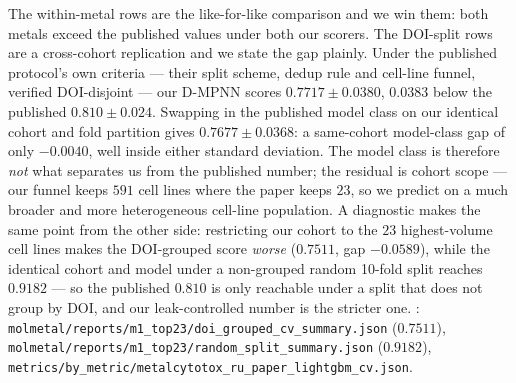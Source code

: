 The within-metal rows are the like-for-like comparison and we win them: both
metals exceed the published values under both our scorers. The DOI-split rows
are a cross-cohort replication and we state the gap plainly. Under the published
protocol's own criteria --- their split scheme, dedup rule and cell-line funnel,
verified DOI-disjoint --- our D-MPNN scores $0.7717 \pm 0.0380$, $0.0383$ below
the published $0.810 \pm 0.024$. Swapping in the published model class on our
identical cohort and fold partition gives $0.7677 \pm 0.0368$: a same-cohort
model-class gap of only $-0.0040$, well inside either standard deviation. The
model class is therefore \emph{not} what separates us from the published number;
the residual is cohort scope --- our funnel keeps $591$ cell lines where the
paper keeps $23$, so we predict on a much broader and more heterogeneous
cell-line population. A diagnostic makes the same point from the other side:
restricting our cohort to the $23$ highest-volume cell lines makes the
DOI-grouped score \emph{worse} ($0.7511$, gap $-0.0589$), while the identical
cohort and model under a non-grouped random 10-fold split reaches $0.9182$ ---
so the published $0.810$ is only reachable under a split that does not group by
DOI, and our leak-controlled number is the stricter one. \MEASURED:
\texttt{molmetal/reports/m1\_top23/doi\_grouped\_cv\_summary.json} ($0.7511$),
\texttt{molmetal/reports/m1\_top23/random\_split\_summary.json} ($0.9182$),
\texttt{metrics/by\_metric/metalcytotox\_ru\_paper\_lightgbm\_cv.json}.
